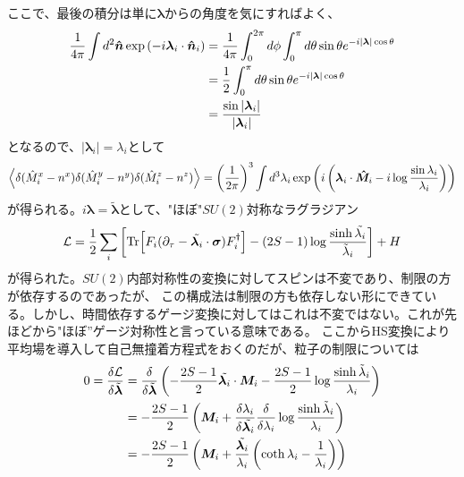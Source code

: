 \documentclass[11pt, aps, longbibliography]{article}
\begin{document}
        ここで、最後の積分は単に$\boldsymbol{\lambda}$からの角度を気にすればよく、
        \begin{align}\label{eq:highS-MF-21}
            \frac{1}{4\pi}\int d^2\boldsymbol{\hat{n}}  \exp \left( -i\boldsymbol{\lambda}_i \cdot \boldsymbol{\hat{n}}_i \right) &= \frac{1}{4\pi}  \int_0^{2\pi} d\phi \int_0^{\pi} d\theta  \sin\theta e^{-i|\boldsymbol{\lambda}|\cos\theta} \notag \\
            &= \frac{1}{2}\int_0^{\pi} d\theta  \sin\theta e^{-i|\boldsymbol{\lambda}|\cos\theta} \notag \\
            &= \frac{\sin |\boldsymbol{\lambda}_i|}{|\boldsymbol{\lambda}_i|}
        \end{align}
        となるので、$|\boldsymbol{\lambda}_i| = \lambda_i$として
        \begin{equation}\label{eq:highS-MF-22}
            \expval{\delta(\hat{M}_i^x - n^x)\delta(\hat{M}_i^y - n^y)\delta(\hat{M}_i^z - n^z)} = \left(\frac{1}{2\pi}\right)^3\int d^3 \lambda_i \exp\left( i \left(\boldsymbol{\lambda}_i \cdot \boldsymbol{\hat{M}}_i -i \log \frac{\sin \lambda_i}{\lambda_i} \right)  \right)  
        \end{equation}
        が得られる。$i\boldsymbol{\lambda} = \tilde{\boldsymbol{\lambda}}$として、"ほぼ"$SU(2)$対称なラグラジアン
        \begin{equation}\label{eq:highS-MF-23}
            \mathcal{L} = \frac{1}{2} \sum_{i} \left[ \Tr[F_i (\partial_\tau - \tilde{\boldsymbol{\lambda}_i}\cdot \boldsymbol{\sigma})F_i^\dagger] - (2S-1) \log \frac{\sinh \tilde{\lambda_i}}{ \tilde{\lambda}_i} \right] + H
        \end{equation}
        が得られた。$SU(2)$内部対称性の変換に対してスピンは不変であり、制限の方が依存するのであったが、
        この構成法は制限の方も依存しない形にできている。しかし、時間依存するゲージ変換に対してはこれは不変ではない。これが先ほどから"ほぼ”ゲージ対称性と言っている意味である。
        ここからHS変換により平均場を導入して自己無撞着方程式をおくのだが、粒子の制限については
        \begin{align}\label{eq:highS-MF-24}
            0 = \frac{\delta \mathcal{L}}{\delta \tilde{\boldsymbol{\lambda}}} &= \frac{\delta}{\delta \tilde{\boldsymbol{\lambda}}} \left( -\frac{2S-1}{2}\tilde{\boldsymbol{\lambda}_i} \cdot \boldsymbol{M}_i - \frac{2S-1}{2}\log \frac{\sinh \tilde{\lambda}_i}{\lambda_i} \right) \notag \\
            &= -\frac{2S-1}{2} \left( \boldsymbol{M}_i + \frac{\delta \lambda_i}{\delta \tilde{\boldsymbol{\lambda}_i}} \frac{\delta}{\delta \lambda_i}\log \frac{\sinh \tilde{\lambda}_i}{\lambda_i}  \right) \notag \\
            &= -\frac{2S-1}{2} \left( \boldsymbol{M}_i + \frac{\tilde{\boldsymbol{\lambda}_i}}{\lambda_i} \left( \coth \lambda_i - \frac{1}{\lambda_i} \right) \right) 
        \end{align}
\end{document}
